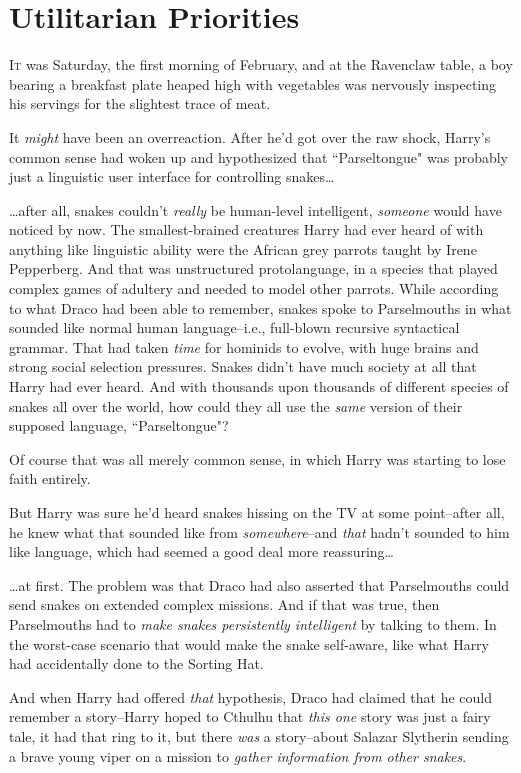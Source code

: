 \chapter{Utilitarian Priorities}

\lettrine{I}{t} was Saturday, the first morning of February, and at the Ravenclaw table, a boy bearing a breakfast plate heaped high with vegetables was nervously inspecting his servings for the slightest trace of meat.

It \emph{might} have been an overreaction. After he'd got over the raw shock, Harry's common sense had woken up and hypothesized that ``Parseltongue" was probably just a linguistic user interface for controlling snakes{\ldots}

{\ldots}after all, snakes couldn't \emph{really} be human-level intelligent, \emph{someone} would have noticed by now. The smallest-brained creatures Harry had ever heard of with anything like linguistic ability were the African grey parrots taught by Irene Pepperberg. And that was unstructured protolanguage, in a species that played complex games of adultery and needed to model other parrots. While according to what Draco had been able to remember, snakes spoke to Parselmouths in what sounded like normal human language\---i.e., full-blown recursive syntactical grammar. That had taken \emph{time} for hominids to evolve, with huge brains and strong social selection pressures. Snakes didn't have much society at all that Harry had ever heard. And with thousands upon thousands of different species of snakes all over the world, how could they all use the \emph{same} version of their supposed language, ``Parseltongue"?

Of course that was all merely common sense, in which Harry was starting to lose faith entirely.

But Harry was sure he'd heard snakes hissing on the TV at some point\---after all, he knew what that sounded like from \emph{somewhere}\---and \emph{that} hadn't sounded to him like language, which had seemed a good deal more reassuring{\ldots}

{\ldots}at first. The problem was that Draco had also asserted that Parselmouths could send snakes on extended complex missions. And if that was true, then Parselmouths had to \emph{make snakes persistently intelligent} by talking to them. In the worst-case scenario that would make the snake self-aware, like what Harry had accidentally done to the Sorting Hat.

And when Harry had offered \emph{that} hypothesis, Draco had claimed that he could remember a story\---Harry hoped to Cthulhu that \emph{this one} story was just a fairy tale, it had that ring to it, but there \emph{was} a story\---about Salazar Slytherin sending a brave young viper on a mission to \emph{gather information from other snakes}.

